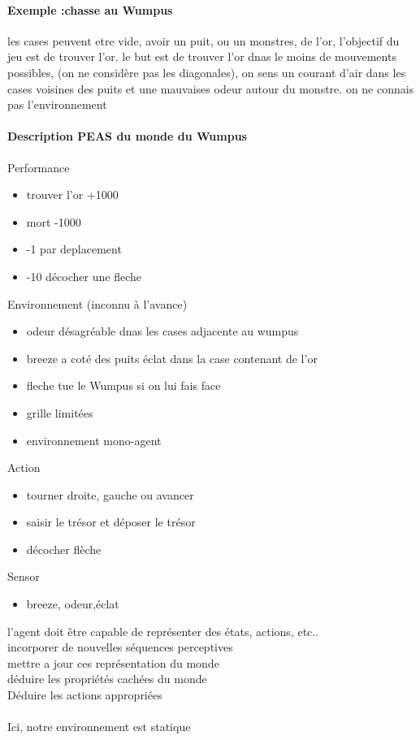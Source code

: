 \documentclass{article}
\begin{document}
\paragraph{Exemple :chasse au Wumpus} les cases peuvent etre vide, avoir un puit, ou un monstres, de l'or, l'objectif du jeu est de trouver l'or. le but est de trouver l'or dnas le moins de mouvements possibles, (on ne considère pas les diagonales), on sens un courant d'air dans les cases voisines des puits et une mauvaises odeur autour du monstre. on ne connais pas l'environnement
\paragraph{Description PEAS du monde du Wumpus}
Performance\\
\begin{itemize}
\item trouver l'or +1000
 \item mort -1000
 \item -1 par deplacement
 \item -10 décocher une fleche
\end{itemize}
Environnement (inconnu à l'avance)\\
\begin{itemize}
\item odeur désagréable dnas les cases adjacente au wumpus
\item breeze a coté des puits
éclat dans la case contenant de l'or
\item fleche tue le Wumpus si on lui fais face
\item grille limitées
\item environnement mono-agent
\end{itemize}
Action\\
\begin{itemize}
\item tourner droite, gauche ou avancer
\item saisir le trésor et déposer le trésor
\item décocher flèche
\end{itemize}
Sensor\\
\begin{itemize}
\item breeze, odeur,éclat
\end{itemize}
l'agent doit être capable de représenter des états, actions, etc..\\incorporer de nouvelles séquences perceptives\\mettre a jour ces représentation du monde\\déduire les propriétés cachées du monde\\Déduire les actions appropriées\\\\Ici, notre environnement est statique
\end{document}
